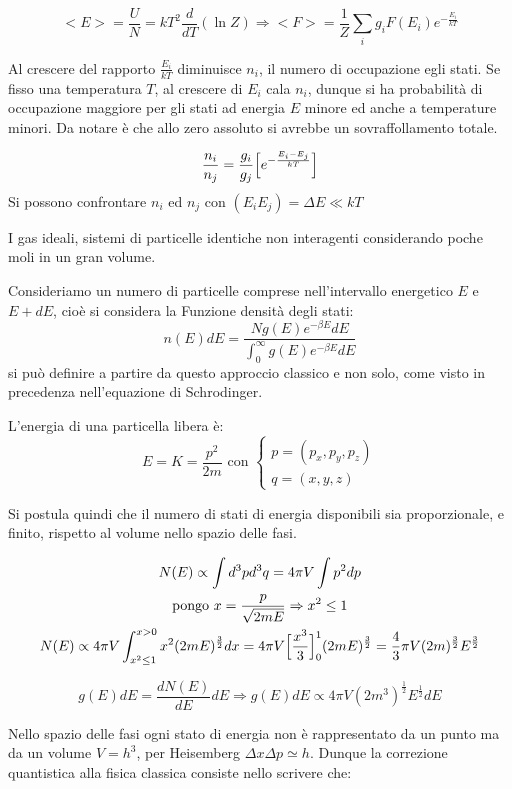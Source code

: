 $$ <E> = \frac{U}{N} = k T^2 \frac{d}{d T} (\ln Z) \Rightarrow <F> = \frac{1}{Z} \sum_i g_i F(E_i) e^{- \frac{E_i}{k T}} $$

Al crescere del rapporto $\frac{E_i}{k T}$ diminuisce $n_i$, il numero di occupazione egli stati.
Se fisso una temperatura $T$, al crescere di $E_i$ cala $n_i$,
dunque si ha probabilità di occupazione maggiore per gli stati ad energia $E$ minore ed anche a temperature minori.
Da notare è che allo zero assoluto si avrebbe un sovraffollamento totale.

$$ \frac{n_i}{n_j} = \frac{g_i}{g_j} \Bigl[ e^{- \frac{E_i - E_j}{k T}}  \Bigr] $$
Si possono confrontare $n_i$ ed $n_j$ con $ (E_i E_j ) = \Delta E \ll k T$

I gas ideali, sistemi di particelle identiche non interagenti considerando poche moli in un gran volume.

Consideriamo un numero di particelle comprese nell'intervallo energetico $E$ e $E+dE$, cioè si considera la Funzione densità degli stati:
$$ n(E)dE = \frac{N g(E) e^{-\beta E} dE}{\int_0^\infty g(E) e^{-\beta E} dE } $$
si può definire a partire da questo approccio classico e non solo, come visto in precedenza nell'equazione di Schrodinger.

L'energia di una particella libera è:
\begin{equation}
E = K = \frac{p^2}{2m}
\mbox{ con }
\begin{cases}
p = (p_x, p_y, p_z) \\
q = (x, y, z)
\end{cases}
\end{equation}

Si postula quindi che il numero di stati di energia disponibili sia proporzionale, e finito, rispetto al volume nello spazio delle fasi.

\begin{gather*} 
 N(E) \propto \int d^3 p d^3 q = 4 \pi V \int p^2 dp \\
\mbox{pongo }  x = \frac{p}{\sqrt{2 m E}} \Rightarrow x^2 \leq 1 \\
N(E) \propto 4 \pi V \int_{x^2 \le 1}^{x > 0} x^2 (2mE)^{\frac{3}{2}} dx = 4 \pi V \Bigl[ \frac{x^3}{3}  \Bigr]_0^1 (2mE)^{\frac{3}{2}} = \frac{4}{3} \pi V (2m)^{\frac{3}{2}} E^{\frac{3}{2}}
\end{gather*}

$$  g(E)dE = \frac{dN(E)}{dE}dE \Rightarrow g(E)dE \propto 4 \pi V (2m^3)^{\frac{1}{2}} E^{\frac{1}{2}} dE $$

Nello spazio delle fasi ogni stato di energia non è rappresentato da un punto ma da un volume $V = h^3$, per Heisemberg $\Delta x \Delta p \simeq h$.
Dunque la correzione quantistica alla fisica classica consiste nello scrivere che:


